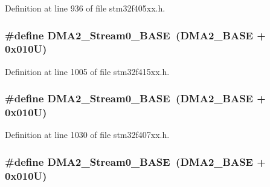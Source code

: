 Definition at line 936 of file stm32f405xx.\+h.

\subsubsection[{\texorpdfstring{D\+M\+A2\+\_\+\+Stream0\+\_\+\+B\+A\+SE}{DMA2_Stream0_BASE}}]{\setlength{\rightskip}{0pt plus 5cm}\#define D\+M\+A2\+\_\+\+Stream0\+\_\+\+B\+A\+SE~({\bf D\+M\+A2\+\_\+\+B\+A\+SE} + 0x010\+U)}\hypertarget{group___peripheral__registers__structures_gac4c67b24726ba6b94d03adb351bcec4d}{}\label{group___peripheral__registers__structures_gac4c67b24726ba6b94d03adb351bcec4d}


Definition at line 1005 of file stm32f415xx.\+h.

\subsubsection[{\texorpdfstring{D\+M\+A2\+\_\+\+Stream0\+\_\+\+B\+A\+SE}{DMA2_Stream0_BASE}}]{\setlength{\rightskip}{0pt plus 5cm}\#define D\+M\+A2\+\_\+\+Stream0\+\_\+\+B\+A\+SE~({\bf D\+M\+A2\+\_\+\+B\+A\+SE} + 0x010\+U)}\hypertarget{group___peripheral__registers__structures_gac4c67b24726ba6b94d03adb351bcec4d}{}\label{group___peripheral__registers__structures_gac4c67b24726ba6b94d03adb351bcec4d}


Definition at line 1030 of file stm32f407xx.\+h.

\subsubsection[{\texorpdfstring{D\+M\+A2\+\_\+\+Stream0\+\_\+\+B\+A\+SE}{DMA2_Stream0_BASE}}]{\setlength{\rightskip}{0pt plus 5cm}\#define D\+M\+A2\+\_\+\+Stream0\+\_\+\+B\+A\+SE~({\bf D\+M\+A2\+\_\+\+B\+A\+SE} + 0x010\+U)}\hypertarget{group___peripheral__registers__structures_gac4c67b24726ba6b94d03adb351bcec4d}{}\label{group___peripheral__registers__structures_gac4c67b24726ba6b94d03adb351bcec4d}


